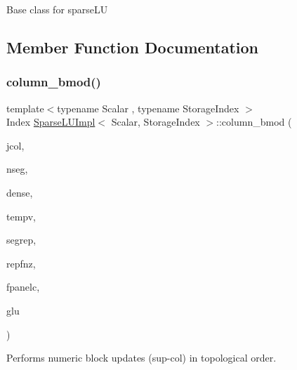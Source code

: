 Base class for sparse\+LU 

\subsection{Member Function Documentation}
\mbox{\label{class_eigen_1_1internal_1_1_sparse_l_u_impl_ae34275602cf12560edfcaf7cd5cbe932}} 
\subsubsection{\texorpdfstring{column\_bmod()}{column\_bmod()}}
{\footnotesize\ttfamily template$<$typename Scalar , typename Storage\+Index $>$ \\
Index \mbox{\hyperlink{class_eigen_1_1internal_1_1_sparse_l_u_impl}{Sparse\+L\+U\+Impl}}$<$ Scalar, Storage\+Index $>$\+::column\+\_\+bmod (\begin{DoxyParamCaption}\item[{const Index}]{jcol,  }\item[{const Index}]{nseg,  }\item[{\mbox{\hyperlink{class_eigen_1_1_ref}{Block\+Scalar\+Vector}}}]{dense,  }\item[{\mbox{\hyperlink{class_eigen_1_1_matrix}{Scalar\+Vector}} \&}]{tempv,  }\item[{\mbox{\hyperlink{class_eigen_1_1_ref}{Block\+Index\+Vector}}}]{segrep,  }\item[{\mbox{\hyperlink{class_eigen_1_1_ref}{Block\+Index\+Vector}}}]{repfnz,  }\item[{Index}]{fpanelc,  }\item[{\mbox{\hyperlink{struct_eigen_1_1internal_1_1_l_u___global_l_u__t}{Global\+L\+U\+\_\+t}} \&}]{glu }\end{DoxyParamCaption})\hspace{0.3cm}{\ttfamily [protected]}}



Performs numeric block updates (sup-\/col) in topological order. 



